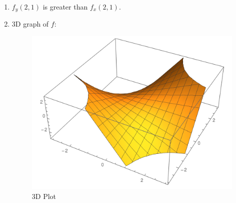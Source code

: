 \documentclass{article}
\begin{document}
\begin{enumerate}[1.]
  \item $f_{y}(2, 1)$ is greater than $f_{x}(2, 1)$.

  \item 3D graph of $f$:

    \begin{figure}[H]
      \centering
      \includegraphics[scale=0.50]{"3DPlot"}
      \caption{3D Plot}
    \end{figure}

\end{enumerate}
\end{document}

